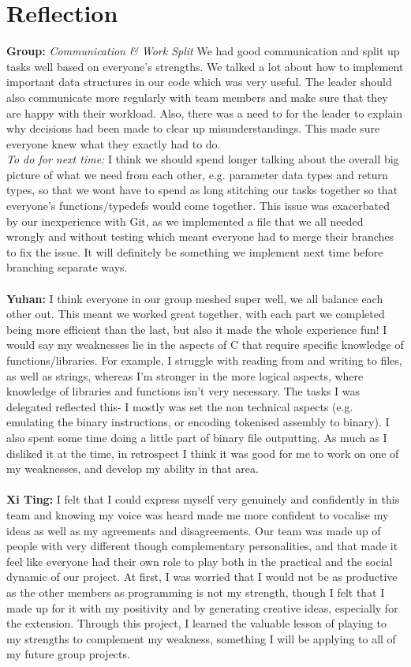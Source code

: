 \documentclass[11pt]{article}
\begin{document}
\section{Reflection}
\textbf{Group:}
\textit{Communication \& Work Split} We had good communication and split up tasks well based on everyone's strengths. We talked a lot about how to implement important data structures in our code which was very useful. The leader should also communicate more regularly with team members and make sure that they are happy with their workload. Also, there was a need to for the leader to explain why decisions had been made to clear up misunderstandings. This made sure everyone knew what they exactly had to do.\\
\textit{To do for next time: }I think we should spend longer talking about the overall big picture of what we need from each other, e.g. parameter data types and return types, so that we wont have to spend as long stitching our tasks together so that everyone's functions/typedefs would come together. This issue was exacerbated by our inexperience with Git, as we implemented a file that we all needed wrongly and without testing which meant everyone had to merge their branches to fix the issue. It will definitely be something we implement next time before branching separate ways.\\
\\
\textbf{Yuhan:} I think everyone in our group meshed super well, we all balance each other out. This meant we worked great together, with each part we completed being more efficient than the last, but also it made the whole experience fun! I would say my weaknesses lie in the aspects of C that require specific knowledge of functions/libraries. For example, I struggle with reading from and writing to files, as well as strings, whereas I’m stronger in the more logical aspects, where knowledge of libraries and functions isn’t very necessary. The tasks I was delegated reflected this- I mostly was set the non technical aspects (e.g. emulating the binary instructions, or encoding tokenised assembly to binary). I also spent some time doing a little part of binary file outputting. As much as I disliked it at the time, in retrospect I think it was good for me to work on one of my weaknesses, and develop my ability in that area.\\
\\
\textbf{Xi Ting:} I felt that I could express myself very genuinely and confidently in this team and knowing my voice was heard made me more confident to vocalise my ideas as well as my agreements and disagreements. Our team was made up of people with very different though complementary personalities, and that made it feel like everyone had their own role to play both in the practical and the social dynamic of our project. At first, I was worried that I would not be as productive as the other members as programming is not my strength, though I felt that I made up for it with my positivity and by generating creative ideas, especially for the extension. Through this project, I learned the valuable lesson of playing to my strengths to complement my weakness, something I will be applying to all of my future group projects.\\
\end{document}
